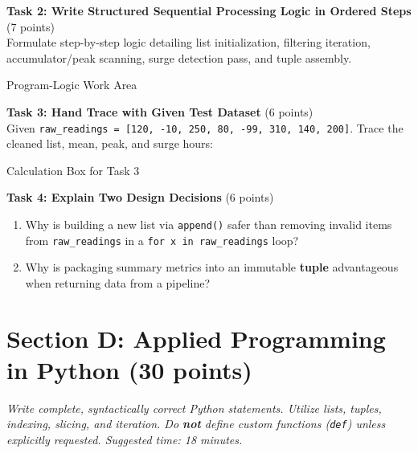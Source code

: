 \documentclass[11pt,a4paper]{article}
\begin{document}
\vspace{0.5mm}
\textbf{Task 2: Write Structured Sequential Processing Logic in Ordered Steps} (7 points)\\
Formulate step-by-step logic detailing list initialization, filtering iteration, accumulator/peak scanning, surge detection pass, and tuple assembly.

\begin{answerbox}[height=5.2cm]{Program-Logic Work Area}
\end{answerbox}

\vspace{0.5mm}
\textbf{Task 3: Hand Trace with Given Test Dataset} (6 points)\\
Given \texttt{raw\_readings = [120, -10, 250, 80, -99, 310, 140, 200]}. Trace the cleaned list, mean, peak, and surge hours:

\begin{answerbox}[height=3.5cm]{Calculation Box for Task 3}
\end{answerbox}

\vspace{0.5mm}
\textbf{Task 4: Explain Two Design Decisions} (6 points)
\begin{enumerate}[label=\alph*),leftmargin=2em]
  \item Why is building a new list via \texttt{append()} safer than removing invalid items from \texttt{raw\_readings} in a \texttt{for x in raw\_readings} loop?\\[3.5mm]
  \hrulefill
  \item Why is packaging summary metrics into an immutable \textbf{tuple} advantageous when returning data from a pipeline?\\[3.5mm]
  \hrulefill
\end{enumerate}

\newpage


\section*{Section D: Applied Programming in Python \hfill \normalsize\normalfont(30 points)}
\textit{Write complete, syntactically correct Python statements. Utilize lists, tuples, indexing, slicing, and iteration. Do \textbf{not} define custom functions (\texttt{def}) unless explicitly requested. Suggested time: 18 minutes.}
\end{document}

